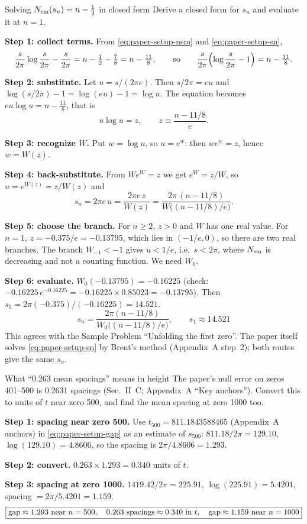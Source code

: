 \begin{sample}{Solving $N_{\mathrm{sm}}(s_n)=n-\tfrac12$ in closed form}
Derive a closed form for $s_n$ and evaluate it at $n=1$.

\textbf{Step 1: collect terms.} From \eqref{eq:paper-setup-nsm} and \eqref{eq:paper-setup-sn},
\[
\frac{s}{2\pi}\log\frac{s}{2\pi}-\frac{s}{2\pi}=n-\tfrac12-\tfrac78=n-\tfrac{11}{8},
\qquad\text{so}\qquad
\frac{s}{2\pi}\Bigl(\log\frac{s}{2\pi}-1\Bigr)=n-\tfrac{11}{8}.
\]

\textbf{Step 2: substitute.} Let $u=s/(2\pi e)$. Then $s/2\pi=eu$ and $\log(s/2\pi)-1=\log(eu)-1=\log u$. The equation becomes $eu\log u=n-\tfrac{11}8$, that is
\[
u\log u=z,\qquad z\equiv\frac{n-11/8}{e}.
\]

\textbf{Step 3: recognize $W$.} Put $w=\log u$, so $u=e^w$: then $we^w=z$, hence $w=W(z)$.

\textbf{Step 4: back-substitute.} From $W e^W=z$ we get $e^{W}=z/W$, so $u=e^{W(z)}=z/W(z)$ and
\begin{equation}
s_n=2\pi e\,u=\frac{2\pi e\,z}{W(z)}=\frac{2\pi\,(n-11/8)}{W\!\bigl((n-11/8)/e\bigr)} .
\label{eq:paper-setup-lambert}
\end{equation}

\textbf{Step 5: choose the branch.} For $n\ge2$, $z>0$ and $W$ has one real value. For $n=1$, $z=-0.375/e=-0.13795$, which lies in $(-1/e,0)$, so there are two real branches. The branch $W_{-1}<-1$ gives $u<1/e$, i.e.\ $s<2\pi$, where $N_{\mathrm{sm}}$ is decreasing and not a counting function. We need $W_0$.

\textbf{Step 6: evaluate.} $W_0(-0.13795)=-0.16225$ (check: $-0.16225\,e^{-0.16225}=-0.16225\times0.85023=-0.13795$). Then $s_1=2\pi(-0.375)/(-0.16225)=14.521$.
\[
\boxed{s_n=\frac{2\pi(n-11/8)}{W_0\bigl((n-11/8)/e\bigr)},\qquad s_1\approx14.521}
\]
This agrees with the Sample Problem ``Unfolding the first zero''. The paper itself solves \eqref{eq:paper-setup-sn} by Brent's method (Appendix~A step~2); both routes give the same $s_n$.
\end{sample}

\begin{sample}{What ``0.263 mean spacings'' means in height}
The paper's null error on zeros 401--500 is 0.2631 spacings (Sec.~II~C; Appendix~A ``Key anchors''). Convert this to units of $t$ near zero 500, and find the mean spacing at zero 1000 too.

\textbf{Step 1: spacing near zero 500.} Use $t_{500}=811.1843588465$ (Appendix~A anchors) in \eqref{eq:paper-setup-gap} as an estimate of $s_{500}$: $811.18/2\pi=129.10$, $\log(129.10)=4.8606$, so the spacing is $2\pi/4.8606=1.293$.

\textbf{Step 2: convert.} $0.263\times1.293=0.340$ units of $t$.

\textbf{Step 3: spacing at zero 1000.} $1419.42/2\pi=225.91$, $\log(225.91)=5.4201$, spacing $=2\pi/5.4201=1.159$.
\[
\boxed{\mathrm{gap}\approx1.293\ \text{near }n=500,\quad 0.263\ \text{spacings}\approx0.340\ \text{in }t,\quad \mathrm{gap}\approx1.159\ \text{near }n=1000}
\]
\end{sample}

